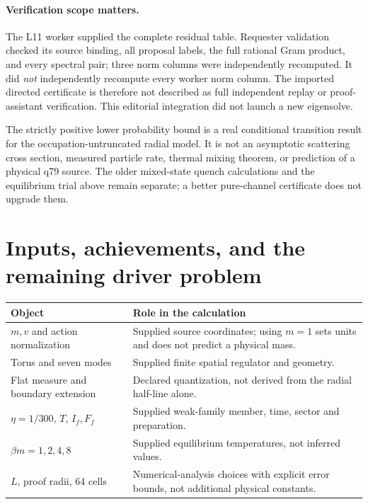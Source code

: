 \documentclass[11pt]{article}
\begin{document}
\paragraph{Verification scope matters.}
The L11 worker supplied the complete residual table. Requester validation
checked its source binding, all proposal labels, the full rational Gram
product, and every spectral pair; three norm columns were independently
recomputed. It did \emph{not} independently recompute every worker norm
column. The imported directed certificate is therefore not described as
full independent replay or proof-assistant verification. This editorial
integration did not launch a new eigensolve.

The strictly positive lower probability bound is a real conditional
transition result for the occupation-untruncated radial model. It is not
an asymptotic scattering cross section, measured particle rate, thermal
mixing theorem, or prediction of a physical q79 source. The older
mixed-state quench calculations and the equilibrium trial above remain
separate; a better pure-channel certificate does not upgrade them.

\section{Inputs, achievements, and the remaining driver problem}
\begin{center}
\begin{tabularx}{\linewidth}{@{}p{.28\linewidth}X@{}}
\toprule
Object & Role in the calculation\\
\midrule
$m,v$ and action normalization & Supplied source coordinates; using $m=1$
sets units and does not predict a physical mass.\\
Torus and seven modes & Supplied finite spatial regulator and geometry.\\
Flat measure and boundary extension & Declared quantization, not derived
from the radial half-line alone.\\
$\eta=1/300$, $T$, $I_f,F_f$ & Supplied weak-family member, time,
sector and preparation.\\
$\beta m=1,2,4,8$ & Supplied equilibrium temperatures, not inferred values.\\
$L$, proof radii, 64 cells & Numerical-analysis choices with explicit
error bounds, not additional physical constants.\\
\bottomrule
\end{tabularx}
\end{center}
\end{document}
